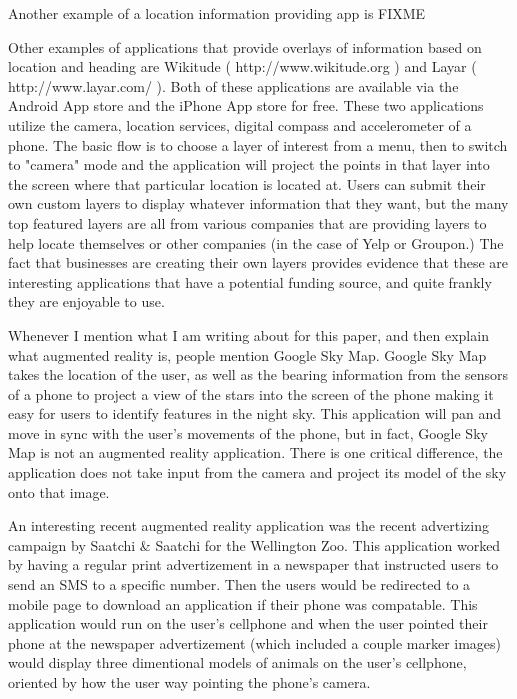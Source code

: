 \documentclass{acm_proc_article-sp}
\begin{document}
Another example of a location information providing app is FIXME

Other examples of applications that provide overlays of information based on location and heading are Wikitude ( http://www.wikitude.org ) and Layar ( http://www.layar.com/ ).  Both of these applications are available via the Android App store and the iPhone App store for free.  These two applications utilize the camera, location services, digital compass and accelerometer of a phone.  The basic flow is to choose a layer of interest from a menu, then to switch to "camera" mode and the application will project the points in that layer into the screen where that particular location is located at.  Users can submit their own custom layers to display whatever information that they want, but the many top featured layers are all from various companies that are providing layers to help locate themselves or other companies (in the case of Yelp or Groupon.)  The fact that businesses are creating their own layers provides evidence that these are interesting applications that have a potential funding source, and quite frankly they are enjoyable to use.

Whenever I mention what I am writing about for this paper, and then explain what augmented reality is, people mention Google Sky Map.  Google Sky Map takes the location of the user, as well as the bearing information from the sensors of a phone to project a view of the stars into the screen of the phone making it easy for users to identify features in the night sky. This application will pan and move in sync with the user's movements of the phone, but in fact, Google Sky Map is not an augmented reality application.  There is one critical difference, the application does not take input from the camera and project its model of the sky onto that image. \cite{Ouilhet:2010:GSM:1851600.1851695}

An interesting recent augmented reality application was the recent advertizing campaign by Saatchi & Saatchi
for the Wellington Zoo.  This application worked by having a regular print advertizement in a newspaper that instructed users to send an SMS to a specific number.  Then the users would be redirected to a mobile page to download an application if their phone was compatable.  This application would run on the user's cellphone and when the user pointed their phone at the newspaper advertizement (which included a couple marker images) would display three dimentional models of animals on the user's cellphone, oriented by how the user way pointing the phone's camera.  \cite{henrysson2007bringing}
\end{document}
